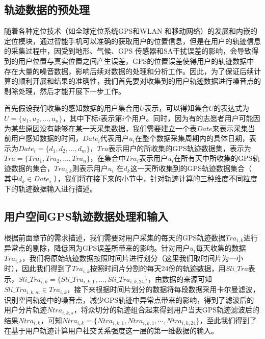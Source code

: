 \subsection{轨迹数据的预处理}
随着各种定位技术（如全球定位系统GPS和WLAN 和移动网络）的发展和内嵌的定位模块，通过智能手机可以准确的获取用户的位置信息，但是在用户的轨迹信息的采集过程中，因受到地形、气候、GPS 传感器和SA干扰误差的影响，会导致得到的用户位置与真实位置之间产生误差，GPS的位置误差使得用户的轨迹数据中存在大量的噪音数据，影响后续对数据的处理和分析工作。因此，为了保证后续计算的顺利开展和结果的准确性，我们首先要对收集到的用户轨迹数据进行噪音点的剔除处理，然后才能开展下一步工作。
\par 首先假设我们收集的感知数据的用户集合用$U$表示，可以得知集合$U$的表达式为$U=\{u_{1},u_{2},...,u_{n}\}$，其中下标$i$表示第$i$个用户。同时，因为有的志愿者用户可能因为某些原因没有能够在某一天采集数据，我们需要建立一个表$Date$来表示采集当前用户感知数据的时间，$Date_{i}$代表用户$u_{i}$在整个数据采集周期内的具体日期，表示为$Date_{i}=\{d_{1},d_{2},...,d_{m}\}$，$Tra$表示用户的所收集的GPS轨迹数据集，表示为$Tra=\{Tra_{1},Tra_{2},...,Tra_{n}\}$，在集合中$Tra_{i}$表示用户$u_{i}$在所有天中所收集的GPS轨迹数据的集合，$Tra_{i,k}$则表示用户$u_{i}$ 在$d_{k}$这一天所收集到的GPS轨迹数据集合（ 其中$ d_{k} \in Date_{i}$ ），我们将在接下来的小节中，针对轨迹计算的三种维度不同粒度下的轨迹数据输入进行描述。

\subsection{用户空间GPS轨迹数据处理和输入}
根据前面章节的需求描述，我们需要对用户采集的每天的GPS轨迹数据$Tra_{i,k}$进行异常点的剔除，降低因为GPS误差所带来的影响。针对用户$u_{i}$每天收集的数据$Tra_{i,k}$，我们将原始轨迹数据按照时间片进行划分（这里我们取时间片为一小时），因此我们得到了$Tra_{i,k}$按照时间片分割的每天24份的轨迹数据，用$Sli\_Tra$表示，$Sli\_Tra_{i,k}=\{Sli\_Tra_{i,k,1},...,Sli\_Tra_{i,k,24}\}$，由数据的来源可知$Sli\_Tra_{i,k,m} \in Tra_{i,k}$，接下来根据时间片划分的数据将每段数据采用卡尔曼滤波，识别空间轨迹中的噪音点，减少GPS轨迹中异常点带来的影响，得到了滤波后的用户分片轨迹$Ntra_{i,k,s}$，将众切分的轨迹组合起来得到用户当天GPS轨迹滤波后的结果$Ntra_{i,k}$，可知$Ntra_{i,k}=\{ Ntra_{i,k,1},Ntra_{i,k,1}, \cdots,Ntra_{i,k,24}\}$，至此我们得到了在基于用户轨迹计算用户社交关系强度这一层的第一维数据的输入。
